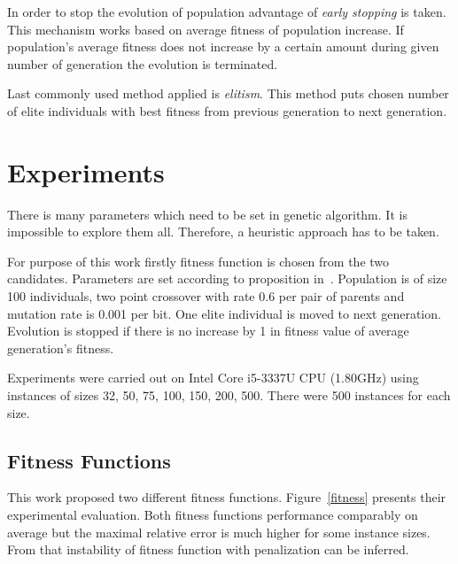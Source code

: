 \documentclass{article}
\begin{document}
In order to stop the evolution of population advantage of
\textit{early stopping} is taken.
This mechanism works based on average fitness of population increase.
If population's average fitness does not increase by a certain amount
during given number of generation the evolution is terminated.

Last commonly used method applied is \textit{elitism}.
This method puts chosen number of elite individuals with best fitness
from previous generation to next generation.

\section{Experiments}

There is many parameters which need to be set in genetic algorithm.
It is impossible to explore them all.
Therefore, a heuristic approach has to be taken.

For purpose of this work firstly fitness function is chosen
from the two candidates.
Parameters are set according to proposition in~\cite{dejong1975}.
Population is of size 100 individuals,
two point crossover with rate 0.6 per pair of parents
and mutation rate is 0.001 per bit.
One elite individual is moved to next generation.
Evolution is stopped if there is no increase by 1 in fitness
value of average generation's fitness.

Experiments were carried out on Intel Core i5-3337U CPU (1.80GHz)
using instances of sizes 32, 50, 75, 100, 150, 200, 500.
There were 500 instances for each size.

\subsection{Fitness Functions}

This work proposed two different fitness functions.
Figure~\ref{fitness} presents their experimental evaluation.
Both fitness functions performance comparably on average
but the maximal relative error is much higher for some instance sizes.
From that instability of fitness function with penalization can be inferred.
\end{document}
